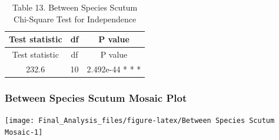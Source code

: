 \begin{longtable}[]{@{}ccc@{}}
\caption{Table 13. Between Species Scutum Chi-Square Test for
Independence}\tabularnewline
\toprule
\begin{minipage}[b]{0.22\columnwidth}\centering\strut
Test statistic\strut
\end{minipage} & \begin{minipage}[b]{0.06\columnwidth}\centering\strut
df\strut
\end{minipage} & \begin{minipage}[b]{0.22\columnwidth}\centering\strut
P value\strut
\end{minipage}\tabularnewline
\midrule
\endfirsthead
\toprule
\begin{minipage}[b]{0.22\columnwidth}\centering\strut
Test statistic\strut
\end{minipage} & \begin{minipage}[b]{0.06\columnwidth}\centering\strut
df\strut
\end{minipage} & \begin{minipage}[b]{0.22\columnwidth}\centering\strut
P value\strut
\end{minipage}\tabularnewline
\midrule
\endhead
\begin{minipage}[t]{0.22\columnwidth}\centering\strut
232.6\strut
\end{minipage} & \begin{minipage}[t]{0.06\columnwidth}\centering\strut
10\strut
\end{minipage} & \begin{minipage}[t]{0.22\columnwidth}\centering\strut
2.492e-44 * * *\strut
\end{minipage}\tabularnewline
\bottomrule
\end{longtable}

\subsubsection{Between Species Scutum Mosaic
Plot}\label{between-species-scutum-mosaic-plot}

\begin{Shaded}
\begin{Highlighting}[]
 \NormalTok{)}
\end{Highlighting}
\end{Shaded}

\begin{center}\texttt{[image: Final\_Analysis\_files/figure-latex/Between Species Scutum Mosaic-1]} \end{center}

